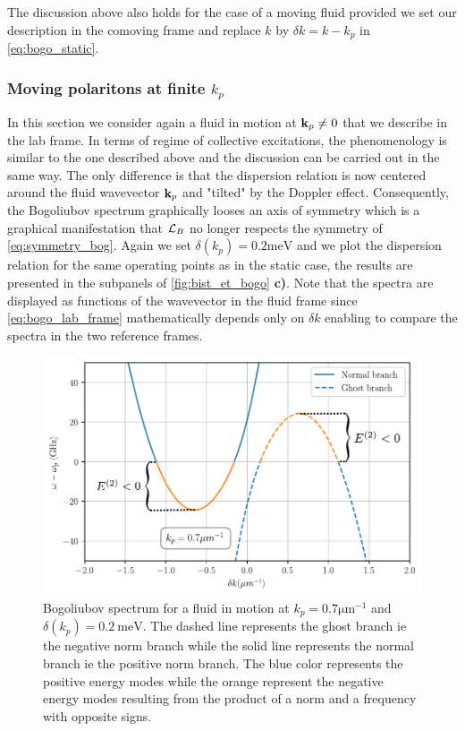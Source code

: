 \bigskip 

The discussion above also holds for the case of a moving fluid provided we set our description in the comoving frame and replace $k$ by $\delta k=k-k_p$ in \autoref{eq:bogo_static}.

\subsubsection{Moving polaritons at finite $k_p$}
In this section we consider again a fluid in motion at $\mathbf{k}_p\neq0$ that we describe in the lab frame. In terms of regime of collective excitations, the phenomenology is similar to the one
described above and the discussion can be carried out in the same way. The only difference is that the dispersion relation is now centered around the fluid wavevector $\mathbf{k}_p$ and "tilted" by the Doppler effect. Consequently, the Bogoliubov spectrum graphically 
looses an axis of symmetry which is a graphical manifestation that $\mathcal{L}_B$ no longer respects the symmetry of \autoref{eq:symmetry_bog}.
Again we set $\delta(k_p)=0.2 \mathrm{meV}$ and we plot the dispersion relation for the same operating points as in the static case, the results are presented in the subpanels of \autoref{fig:bist_et_bogo} \textbf{c)}. Note that the spectra are displayed as functions 
of the wavevector in the fluid frame since \autoref{eq:bogo_lab_frame} mathematically depends only on $\delta k$ enabling to compare the spectra in the two reference frames.

\begin{figure}[!htbp]
    \centering
    \includegraphics[width=\textwidth]{chap_AG_theory/fig/bogo_gap_supersonic_dispersion.pdf}
    \caption{Bogoliubov spectrum for a fluid in motion at $k_p=0.7 \mathrm{\mu m^{-1}}$ and $\delta(k_p)=0.2 \ \mathrm{meV}$. The dashed line represents the ghost branch ie the negative norm branch while the solid line
    represents the normal branch ie the positive norm branch. The blue color represents the positive energy modes while the orange represent the negative energy modes resulting from the 
    product of a norm and a frequency with opposite signs.}
    \label{fig:gapped_supersonic}
\end{figure}

